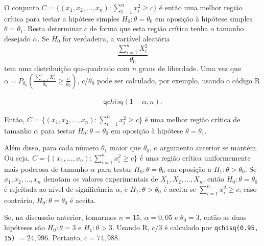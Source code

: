 \documentclass[12pt]{beamer}
\begin{document}
\begin{frame}{}
\begin{block}{}
\justifying
O conjunto $C = \{(x_1, x_2, \ldots, x_n) : \sum_{i=1}^{n}x_i^2 \geq c\}$ é então uma melhor região crítica para testar a hipótese simples $H_0: \theta = \theta_0$ em oposição à hipótese simples $\theta = \theta_1$. Resta determinar $c$ de forma que esta região crítica tenha o tamanho desejado $\alpha$. Se $H_0$ for verdadeira, a variável aleatória
\begin{equation}
\frac{\sum_{i=1}^{n}X_i^2}{\theta_0}
\end{equation}
tem uma distribuição qui-quadrado com $n$ graus de liberdade. Uma vez que $\alpha = P_{\theta_0} \left(\frac{\sum_{i=1}^{n}X_i^2}{\theta_0} \geq \frac{c}{\theta_0}\right)$, $c/\theta_0$ pode ser calculado, por exemplo, usando o código R 

\begin{align*}
    {\texttt qchisq(1 - \alpha, n)}.
\end{align*}

Então, $C = \{(x_1, x_2, \ldots, x_n) : \sum_{i=1}^{n}x_i^2 \geq c\}$ é uma melhor região crítica de tamanho $\alpha$ para testar $H_0: \theta = \theta_0$ em oposição à hipótese $\theta = \theta_1$.


\end{block}
\end{frame}

\begin{frame}{}
\begin{block}{}
\justifying
Além disso, para cada número $\theta_1$ maior que $\theta_0$, o argumento anterior se mantém. Ou seja, $C = \{(x_1, \ldots, x_n) : \sum_{i=1}^{n}x_i^2 \geq c\}$ é uma região crítica uniformemente mais poderosa de tamanho $\alpha$ para testar $H_0: \theta = \theta_0$ em oposição a $H_1: \theta > \theta_0$. Se $x_1, x_2, \ldots, x_n$ denotam os valores experimentais de $X_1, X_2, \ldots, X_n$, então $H_0: \theta = \theta_0$ é rejeitada ao nível de significância $\alpha$, e $H_1: \theta > \theta_0$ é aceita se $\sum_{i=1}^{n}x_i^2 \geq c$; caso contrário, $H_0: \theta = \theta_0$ é aceita.

Se, na discussão anterior, tomarmos $n = 15$, $\alpha = 0,05$ e $\theta_0 = 3$, então as duas hipóteses são $H_0: \theta = 3$ e $H_1: \theta > 3$. Usando R, $c/3$ é calculado por \texttt{qchisq(0.95, 15)} $= 24,996$. Portanto, $c = 74,988$.

\end{block}
\end{frame}
\end{document}

